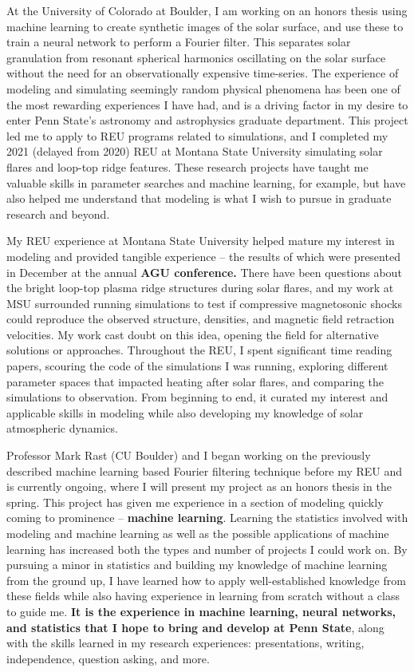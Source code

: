\documentclass[12pt,letterpaper]{article}
\begin{document}
At the University of Colorado at Boulder, I am working on an honors thesis using machine learning to create synthetic images of the solar surface, and use these to train a neural network to perform a Fourier filter. This separates solar granulation from resonant spherical harmonics oscillating on the solar surface without the need for an observationally expensive time-series. The experience of modeling and simulating seemingly random physical phenomena has been one of the most rewarding experiences I have had, and is a driving factor in my desire to enter Penn State's astronomy and astrophysics graduate department. This project led me to apply to REU programs related to simulations, and I completed my 2021 (delayed from 2020) REU at Montana State University simulating solar flares and loop-top ridge features. These research projects have taught me valuable skills in parameter searches and machine learning, for example, but have also helped me understand that modeling is what I wish to pursue in graduate research and beyond.
 
My REU experience at Montana State University helped mature my interest in modeling and provided tangible experience – the results of which were presented in December at the annual \textbf{AGU conference.} There have been questions about the bright loop-top plasma ridge structures during solar flares, and my work at MSU surrounded running simulations to test if compressive magnetosonic shocks could reproduce the observed structure, densities, and magnetic field retraction velocities. My work cast doubt on this idea, opening the field for alternative solutions or approaches. Throughout the REU, I spent significant time reading papers, scouring the code of the simulations I was running, exploring different parameter spaces that impacted heating after solar flares, and comparing the simulations to observation. From beginning to end, it curated my interest and applicable skills in modeling while also developing my knowledge of solar atmospheric dynamics. 

Professor Mark Rast (CU Boulder) and I began working on the previously described machine learning based Fourier filtering technique before my REU and is currently ongoing, where I will present my project as an honors thesis in the spring. This project has given me experience in a section of modeling quickly coming to prominence -- \textbf{machine learning}. Learning the statistics involved with modeling and machine learning as well as the possible applications of machine learning has increased both the types and number of projects I could work on. By pursuing a minor in statistics and building my knowledge of machine learning from the ground up, I have learned how to apply well-established knowledge from these fields while also having experience in learning from scratch without a class to guide me. \textbf{It is the experience in machine learning, neural networks, and statistics that I hope to bring and develop at Penn State}, along with the skills learned in my research experiences: presentations, writing, independence, question asking, and more.
\end{document}
